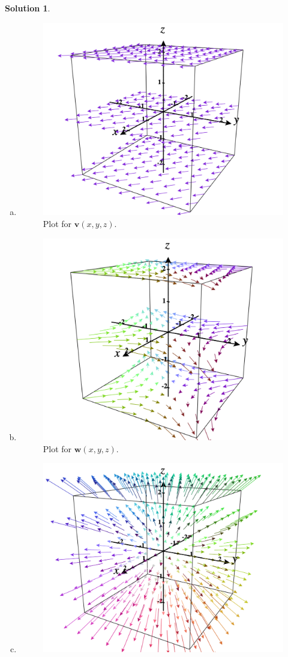 \documentclass[12pt]{report} %
\theoremstyle{definition}
\newtheorem{solution}{Solution}
\begin{document}
\begin{solution}~
\begin{enumerate}[(a)]
    \item 
    \begin{figure}[H]
        \centering
        \includegraphics[width=.6\textwidth]{Images/5a.png}
        \caption{Plot for $\mathbf{v}(x,y,z)$.}
    \end{figure}
    \item 
    \begin{figure}[H]
        \centering
        \includegraphics[width=.6\textwidth]{Images/5b.png}
        \caption{Plot for $\mathbf{w}(x,y,z)$.}
    \end{figure}
    \item 
    \begin{figure}[H]
        \centering
        \includegraphics[width=.6\textwidth]{Images/5c.png}

\end{figure}
\end{enumerate}
\end{solution}
\end{document}
